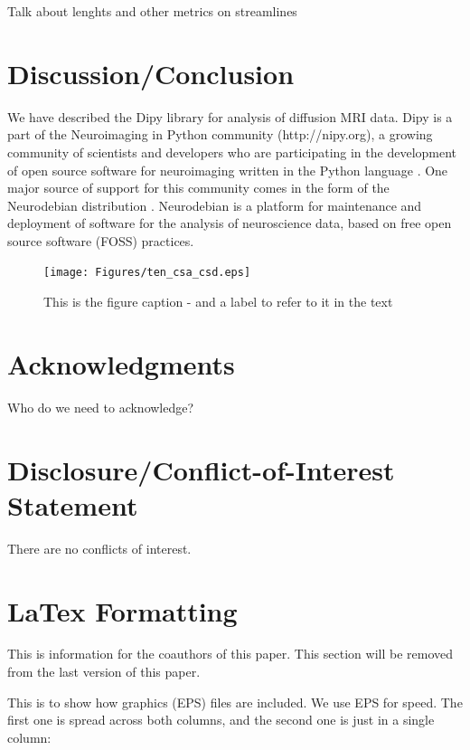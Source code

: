 \documentclass{bioinfo}
\begin{document}
Talk about lenghts and other metrics on streamlines

\section{Discussion/Conclusion}

We have described the Dipy library for analysis of diffusion MRI data. Dipy is a part of the Neuroimaging in Python community (http://nipy.org), a growing community of scientists and developers who are participating in the development of open source software for neuroimaging written in the Python language  . One major source of support for this community comes in the form of the Neurodebian distribution \citep{Halchenko2012}. Neurodebian is a platform for maintenance and deployment of software for the analysis of neuroscience data, based on free open source software (FOSS) practices.

\begin{figure}
\centerline{\texttt{[image: Figures/ten\_csa\_csd.eps]}}
\caption{This is the figure caption - and a label to refer to it in the text \label{Fig:ten_csa_csd}}
\end{figure}

\section*{Acknowledgments}
Who do we need to acknowledge?

\section*{Disclosure/Conflict-of-Interest Statement}
There are no conflicts of interest.

\section{LaTex Formatting}

This is information for the coauthors of this paper. This section will be removed from the last version of this paper.

This is to show how graphics (EPS) files are included. We use EPS for
speed. The first one is spread across both columns, and the second one
is just in a single column:
\end{document}
